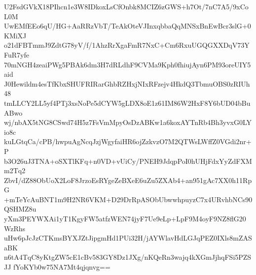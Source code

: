 U2FsdGVkX18PIhcn1e3W8IDkoxLsCfOnbk8MCIZ6zGWS+h7Ot/7nC7A5/9xCoL0M
UwEMfEEo6qU/HG+AaRRzVbT/TeAkOteVJInxqbbaQqMNSxBnEwBcr3slG+0KMiXJ
o21dFBTmmJ9ZdtG78yV/f/1AhzRrXgaFmR7NxC+Cm6RxuUGQGXXDqV73YFuR7yfe
70mNGH4zeaiPWg5PBAk6dm3H7dRLdhF9CVMa9Kph0fhiujAyn6PM93oreUIY5aid
J0Hewildm4esTfKbxSHUFRIRarGhbRZHxjNIxRFzejv4HkdQ3TbmuOBS0zRIUh48
tmLLCY2LL5yf4PTj3xsNoPe5dCYW5gLDX8oE1z61IM86W2HxF8Y6bUD04bBuABwo
wj/nbAX5tNG8CSwd74H5z7FsVmMpyOsDzABKw1a6koxAYTnRb4Bh3yvxG0LYio8c
kuLGtqCa/cPB/hwpuAgNcqJzjWgyfaiHR6ojZzkvzO7M2QTWsLWffZ0VGdi2nr+P
b3O26uJ3TNA+oSXTlKFq+n0VD+vUiCy/PNEH9JdqpPoI0hUHjFdxYyZdFXMm2Tq2
ZbvI/dZ88ObUoX2LoF8JrzoEsRYgeZeBXeE6uZu5ZXAb4+an951gAc7XX0h11RpG
+mTeYcAuBNT1m9H2NR6VKM+D29DrRpASObUbwwhpuyzC7x4URvhbNCs90QSHMZ8u
yXm3PEYWXAi1yT1KgyFW5atfzWEN74jyF7Ue9eLp+LpF9M4oyF9NZ8flG20WzRhs
uHw6pJcJzCTKmsBYXJZtJipgmHd1PUi32H/jAYWlavHdLGJqPEZ0IXls8mZASaBK
n6tA4TqC8yKtgZW5cE1cBv583GY8Dz1JXg/nKQeRn3wajq4kXGmJjhqFSi5PZSJJ
fYoKYb0w75NA7Mt4qjqnvg==
